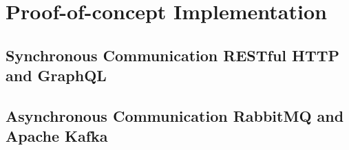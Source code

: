 
\chapter{Proof-of-concept Implementation}\label{cha:Implementation}

\section{Synchronous Communication RESTful HTTP and GraphQL}\label{cha:Implementation:sync}


\clearpage
\section{Asynchronous Communication RabbitMQ and Apache Kafka}\label{cha:Implementation:async}
